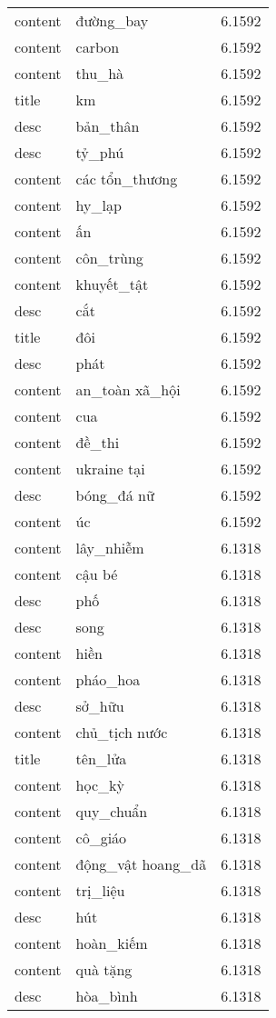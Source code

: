 \documentclass{article}
\begin{document}
\begin{tabular}{lll}
content & đường\_bay & 6.1592\\
content & carbon & 6.1592\\
content & thu\_hà & 6.1592\\
title & km & 6.1592\\
desc & bản\_thân & 6.1592\\
desc & tỷ\_phú & 6.1592\\
content & các tổn\_thương & 6.1592\\
content & hy\_lạp & 6.1592\\
content & ấn & 6.1592\\
content & côn\_trùng & 6.1592\\
content & khuyết\_tật & 6.1592\\
desc & cắt & 6.1592\\
title & đôi & 6.1592\\
desc & phát & 6.1592\\
content & an\_toàn xã\_hội & 6.1592\\
content & cua & 6.1592\\
content & đề\_thi & 6.1592\\
content & ukraine tại & 6.1592\\
desc & bóng\_đá nữ & 6.1592\\
content & úc & 6.1592\\
content & lây\_nhiễm & 6.1318\\
content & cậu bé & 6.1318\\
desc & phố & 6.1318\\
desc & song & 6.1318\\
content & hiền & 6.1318\\
content & pháo\_hoa & 6.1318\\
desc & sở\_hữu & 6.1318\\
content & chủ\_tịch nước & 6.1318\\
title & tên\_lửa & 6.1318\\
content & học\_kỳ & 6.1318\\
content & quy\_chuẩn & 6.1318\\
content & cô\_giáo & 6.1318\\
content & động\_vật hoang\_dã & 6.1318\\
content & trị\_liệu & 6.1318\\
desc & hút & 6.1318\\
content & hoàn\_kiếm & 6.1318\\
content & quà tặng & 6.1318\\
desc & hòa\_bình & 6.1318\\

\end{tabular}
\end{document}
